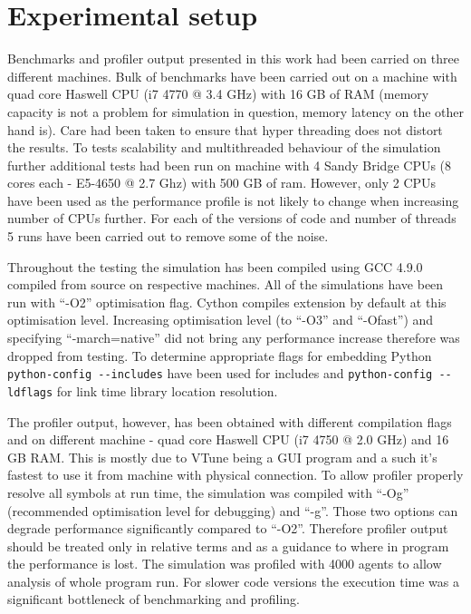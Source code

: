 \documentclass[12pt, a4paper]{report}
\begin{document}
\section{Experimental setup}\label{sec:exp-setup}

Benchmarks and profiler output presented in this work had been carried
on three different machines. Bulk of benchmarks have been carried
out on a machine with quad core Haswell CPU (i7 4770 @ 3.4 GHz) with
16 GB of RAM (memory capacity is not a problem for simulation in
question, memory latency on the other hand is). Care
had been taken to ensure that hyper threading does not distort the results.
To tests scalability and multithreaded behaviour of the simulation further
additional tests had been run on machine with 4 Sandy Bridge CPUs
(8 cores each - E5-4650 @ 2.7 Ghz) with 500 GB of ram. However, only 2 CPUs
have been used as the performance profile is not likely to change when
increasing number of CPUs further. For each of the versions of code and
number of threads 5 runs have been carried out to remove some of the noise.

Throughout the testing the simulation has been compiled using GCC 4.9.0
compiled from source on respective machines. All of the simulations have
been run with ``-O2'' optimisation flag. Cython compiles extension by
default at this optimisation level. Increasing optimisation level
(to ``-O3'' and ``-Ofast'') and specifying ``-march=native'' did not bring
any performance increase therefore was dropped from testing. To determine
appropriate flags for embedding Python \lstinline{python-config --includes}
have been used for includes and \lstinline{python-config --ldflags} for
link time library location resolution.

The profiler output, however, has been obtained with different compilation
flags and on different machine - quad core Haswell CPU (i7 4750 @ 2.0 GHz)
and 16 GB RAM. This is mostly due to VTune being a GUI program and a such it's
fastest to use it from machine with physical connection.
To allow profiler properly resolve all symbols at run time, the simulation
was compiled with ``-Og'' (recommended optimisation level for debugging)
and ``-g''. Those two options can degrade performance significantly compared
to ``-O2''. Therefore profiler output should be treated only in relative
terms and as a guidance to where in program the performance is lost. The
simulation was profiled with 4000 agents to allow analysis of whole program
run. For slower code versions the execution time was a significant bottleneck
of benchmarking and profiling.
\end{document}
